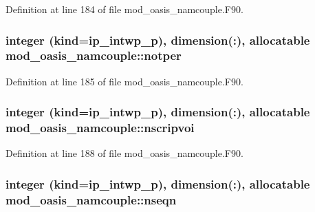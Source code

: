 Definition at line 184 of file mod\+\_\+oasis\+\_\+namcouple.\+F90.

\hypertarget{classmod__oasis__namcouple_ac154fc90756832bc90d02ea21f7c7e17}{
\subsubsection[{notper}]{\setlength{\rightskip}{0pt plus 5cm}integer (kind=ip\+\_\+intwp\+\_\+p), dimension(\+:), allocatable mod\+\_\+oasis\+\_\+namcouple\+::notper\hspace{0.3cm}{\ttfamily [private]}}}\label{classmod__oasis__namcouple_ac154fc90756832bc90d02ea21f7c7e17}


Definition at line 185 of file mod\+\_\+oasis\+\_\+namcouple.\+F90.

\hypertarget{classmod__oasis__namcouple_abb6f67bfba2cba424dabee3a465fdfd5}{
\subsubsection[{nscripvoi}]{\setlength{\rightskip}{0pt plus 5cm}integer (kind=ip\+\_\+intwp\+\_\+p), dimension(\+:), allocatable mod\+\_\+oasis\+\_\+namcouple\+::nscripvoi\hspace{0.3cm}{\ttfamily [private]}}}\label{classmod__oasis__namcouple_abb6f67bfba2cba424dabee3a465fdfd5}


Definition at line 188 of file mod\+\_\+oasis\+\_\+namcouple.\+F90.

\hypertarget{classmod__oasis__namcouple_a20e9486f3e8bbdcee0de935e9be3a2e8}{
\subsubsection[{nseqn}]{\setlength{\rightskip}{0pt plus 5cm}integer (kind=ip\+\_\+intwp\+\_\+p), dimension(\+:), allocatable mod\+\_\+oasis\+\_\+namcouple\+::nseqn\hspace{0.3cm}{\ttfamily [private]}}}\label{classmod__oasis__namcouple_a20e9486f3e8bbdcee0de935e9be3a2e8}


